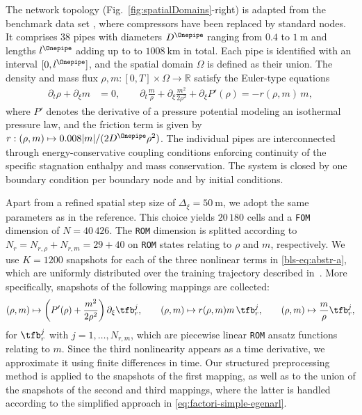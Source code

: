 \documentclass[onefignum,onetabnum]{siamart251104}
\newcommand{\Nr}{{N_r}}
\newcommand{\xp}{{\xi}} %
\newcommand{\acro}[1]{{\texttt{#1}}}  %
\begin{document}
The network topology (Fig.~\ref{fig:spatialDomains}-right) is  adapted from the benchmark data set \cite[GasLib-40]{art:gaslib-2017}, where compressors have been replaced by standard nodes. It comprises 38 pipes with diameters $D^\Onepipe$ ranging from $0.4$ to $1~\mathrm{m}$ and lengths $l^\Onepipe$ adding up to to $1008~\mathrm{km}$ in total.
Each pipe is identified with an interval $[0,l^\Onepipe]$, and the spatial domain $\Omega$ is defined as their union. The density and mass flux $\rho,m: [0,T]\times \Omega \rightarrow \mathbb{R}$ satisfy the Euler-type equations
\begin{align} \label{bls-eq:abstr-a}
\partial_t \rho + \partial_\xp m &= 0, \qquad
\partial_t \frac{m}{\rho} + \partial_\xp \frac{m^2}{2\rho^2} + \partial_\xp P'(\rho) = -r(\rho,m)\,m,
\end{align}
where $P'$ denotes the derivative of a pressure potential modeling an isothermal pressure law, and the friction term is given by $r: (\rho,m) \mapsto 0.008 |m|/(2D^\Onepipe \rho^2)$. The individual pipes are interconnected through energy-conservative coupling conditions enforcing continuity of the specific stagnation enthalpy and mass conservation. The system is closed by one boundary condition per boundary node and by initial conditions.

Apart from a refined spatial step size of $\Delta_\xi = 50~\mathrm{m}$, we adopt the same parameters as in the reference. %
This choice yields $20{\,}180$ cells and a \acro{FOM} dimension of $N = 40{\,}426$. The \acro{ROM} dimension is splitted according to $\Nr = N_{r,\rho} + N_{r,m} = 29 + 40$ on \acro{ROM} states relating to $\rho$ and $m$, respectively.
We use $K = 1200$ snapshots for each of the three nonlinear terms in \eqref{bls-eq:abstr-a}, which are uniformly distributed over the training trajectory described in~\cite{art:bls-snapBasedMorComp}.
More specifically, snapshots of the following mappings are collected:
{\small
\begin{align*} %
	(\rho,m) \mapsto  \left( P'(\rho)+ \frac{m^2}{2 \rho^2} \right) \partial_\xp \tfb^j_r , \qquad 
	(\rho,m) \mapsto r(\rho,m) m \, \tfb^j_r  , \qquad  
	(\rho,m) \mapsto 	\frac{m}{\rho} \tfb^j_r,
\end{align*}
}for $\tfb^j_r$ with $j = 1,\ldots, N_{r,m}$, which are piecewise linear \acro{ROM} ansatz functions relating to $m$. Since the third nonlinearity appears as a time derivative, we approximate it using finite differences in time. Our structured preprocessing method is applied to the snapshots of the first mapping, as well as to the union of the snapshots of the second and third mappings, where the latter is handled according to the simplified approach in \eqref{eq:factori-simple-egenarl}.
\end{document}
